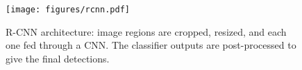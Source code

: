 \begin{figure}[ht]
\begin{center}
\texttt{[image: figures/rcnn.pdf]}
\caption{
R-CNN architecture: image regions are cropped, resized, and each one fed through a CNN.
The classifier outputs are post-processed to give the final detections.
}\label{fig:rcnn}
\end{center}
\end{figure}
